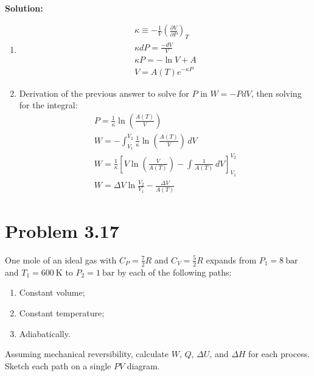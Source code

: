 \documentclass{article}
\newenvironment{solution}{\par\noindent\textbf{\\Solution:\\}}{\par\medskip}
\begin{document}
\begin{solution}
  \begin{enumerate}[label=(\alph*)]
    \item
      \begin{gather*}
        \kappa \equiv -\frac{1}{V}\left( \frac{\partial V}{\partial P}
        \right)_{T} \\
        \kappa dP = \frac{-dV}{V} \\
        \kappa P = -\ln V + A \\
        \boxed{ V = A\left( T \right)e^{-\kappa P} }
      \end{gather*}
    \item Derivation of the previous answer to solve for $P$ in
      $W=-PdV$, then solving for the integral:
      \begin{gather*}
        P = \frac{1}{\kappa }\ln\left( \frac{A\left( T \right)}{V} \right) \\
        W = -\int_{V_{1}}^{V_{2}} \frac{1}{\kappa }\ln\left(
        \frac{A\left( T \right)}{V} \right) \, dV \\
        W = \frac{1}{\kappa }\left[ V\ln\left( \frac{V}{A\left( T
          \right)} \right)-\int \frac{1}{A\left( T \right)} \, dV
        \right]_{V_{1}}^{V_{2}}\\
        \boxed{ W = \Delta V \ln \frac{V_{2}}{V_{1}} - \frac{\Delta
        V}{A\left( T \right)} }
      \end{gather*}
  \end{enumerate}
\end{solution}

\section*{Problem 3.17}
One mole of an ideal gas with $C_P = \frac{7}{2}R$ and $C_V =
\frac{5}{2}R$ expands from $P_1 = \SI{8}{\bar}$ and $T_1 =
\SI{600}{\kelvin}$ to $P_2 = \SI{1}{\bar}$ by each of the following paths:
\begin{enumerate}[label=(\alph*)]
  \item Constant volume;
  \item Constant temperature;
  \item Adiabatically.
\end{enumerate}
Assuming mechanical reversibility, calculate $W$, $Q$, $\Delta U$,
and $\Delta H$ for each process. Sketch each path on a single $PV$ diagram.
\end{document}
